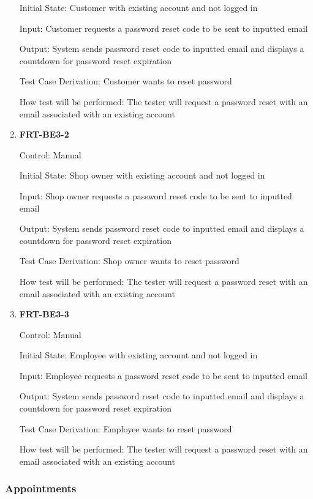 \documentclass[12pt, titlepage]{article}
\begin{document}
\begin{enumerate}
	      Initial State: Customer with existing account and not logged in

	      Input: Customer requests a password reset code to be sent to inputted email

	      Output: System sends password reset code to inputted email and displays a countdown for password
	      reset expiration

	      Test Case Derivation: Customer wants to reset password

	      How test will be performed: The tester will request a password reset with an email associated with
	      an existing account

	\item \textbf{FRT-BE3-2}

	      Control: Manual

	      Initial State: Shop owner with existing account and not logged in

	      Input: Shop owner requests a password reset code to be sent to inputted email

	      Output: System sends password reset code to inputted email and displays a countdown for password
	      reset expiration

	      Test Case Derivation: Shop owner wants to reset password

	      How test will be performed: The tester will request a password reset with an email associated with
	      an existing account

	\item \textbf{FRT-BE3-3}

	      Control: Manual

	      Initial State: Employee with existing account and not logged in

	      Input: Employee requests a password reset code to be sent to inputted email

	      Output: System sends password reset code to inputted email and displays a countdown for password
	      reset expiration

	      Test Case Derivation: Employee wants to reset password

	      How test will be performed: The tester will request a password reset with an email associated with
	      an existing account

\end{enumerate}

\subsubsection{Appointments}
\end{document}
